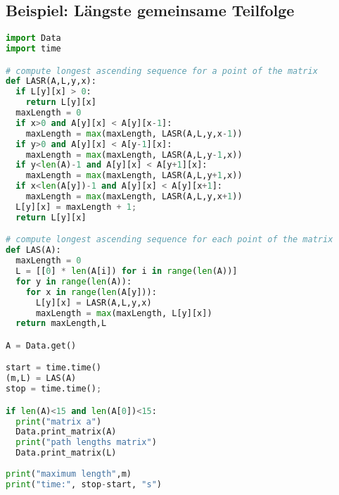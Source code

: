 \documentclass[german]{latex4ei/latex4ei_sheet}
\begin{document}
\begin{sectionbox}
\subsection{Beispiel: Längste gemeinsame Teilfolge}
\begin{lstlisting}[language=Python]
import Data
import time

# compute longest ascending sequence for a point of the matrix
def LASR(A,L,y,x):
  if L[y][x] > 0:
    return L[y][x]
  maxLength = 0
  if x>0 and A[y][x] < A[y][x-1]: 
    maxLength = max(maxLength, LASR(A,L,y,x-1))
  if y>0 and A[y][x] < A[y-1][x]: 
    maxLength = max(maxLength, LASR(A,L,y-1,x))
  if y<len(A)-1 and A[y][x] < A[y+1][x]: 
    maxLength = max(maxLength, LASR(A,L,y+1,x))
  if x<len(A[y])-1 and A[y][x] < A[y][x+1]: 
    maxLength = max(maxLength, LASR(A,L,y,x+1))
  L[y][x] = maxLength + 1;
  return L[y][x]

# compute longest ascending sequence for each point of the matrix
def LAS(A):
  maxLength = 0
  L = [[0] * len(A[i]) for i in range(len(A))]
  for y in range(len(A)):
    for x in range(len(A[y])):
      L[y][x] = LASR(A,L,y,x)
      maxLength = max(maxLength, L[y][x])
  return maxLength,L

A = Data.get()

start = time.time()
(m,L) = LAS(A)
stop = time.time();

if len(A)<15 and len(A[0])<15:
  print("matrix a")
  Data.print_matrix(A)
  print("path lengths matrix")
  Data.print_matrix(L)
  
print("maximum length",m)
print("time:", stop-start, "s")
\end{lstlisting}\vspace{-6px}
\end{sectionbox}
\end{document}
